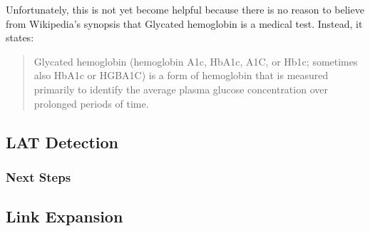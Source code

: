 \documentclass[12pt,letterpaper]{article}
\begin{document}
Unfortunately, this is not yet become helpful because there is no reason to believe from Wikipedia's synopsis that Glycated hemoglobin is a medical test. Instead, it states:
\begin{quote}
Glycated hemoglobin (hemoglobin A1c, HbA1c, A1C, or Hb1c; sometimes also HbA1c or HGBA1C) is a form of hemoglobin that is measured primarily to identify the average plasma glucose concentration over prolonged periods of time.
\end{quote} 
\subsection{LAT Detection}
\subsubsection{Next Steps}
\subsection{Link Expansion}
\end{document}
